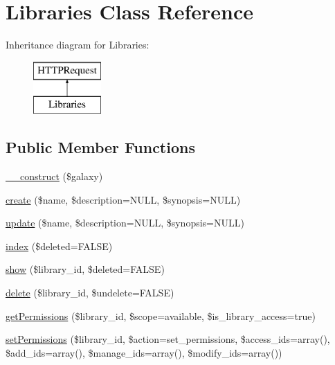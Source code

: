 \hypertarget{classLibraries}{}\section{Libraries Class Reference}
\label{classLibraries}
Inheritance diagram for Libraries\+:\begin{figure}[H]
\begin{center}
\leavevmode
\includegraphics[height=2.000000cm]{classLibraries}
\end{center}
\end{figure}
\subsection*{Public Member Functions}
\begin{DoxyCompactItemize}
\item 
\hyperlink{classLibraries_a84aba8841f094815b3af6e4affed79c0}{\+\_\+\+\_\+construct} (\$galaxy)
\item 
\hyperlink{classLibraries_a5090fa7a9be0e26a91590d651a32abe9}{create} (\$name, \$description=N\+U\+LL, \$synopsis=N\+U\+LL)
\item 
\hyperlink{classLibraries_a66d9b028c4fde6edef8e3b7e0582d884}{update} (\$name, \$description=N\+U\+LL, \$synopsis=N\+U\+LL)
\item 
\hyperlink{classLibraries_a93ffa5a990c77a0872a3adb2f0a69158}{index} (\$deleted=F\+A\+L\+SE)
\item 
\hyperlink{classLibraries_a8310b5f58da502f256e87b8d42915454}{show} (\$library\+\_\+id, \$deleted=F\+A\+L\+SE)
\item 
\hyperlink{classLibraries_a3de3c2fdbaa21d621ad6fd7bb4f83a49}{delete} (\$library\+\_\+id, \$undelete=F\+A\+L\+SE)
\item 
\hyperlink{classLibraries_abad2211e5699eb1c296db1ac22bf478c}{get\+Permissions} (\$library\+\_\+id, \$scope=\textquotesingle{}available\textquotesingle{}, \$is\+\_\+library\+\_\+access=true)
\item 
\hyperlink{classLibraries_aea282014c5f7a983977c2b920885e798}{set\+Permissions} (\$library\+\_\+id, \$action=\textquotesingle{}set\+\_\+permissions\textquotesingle{}, \$access\+\_\+ids=array(), \$add\+\_\+ids=array(), \$manage\+\_\+ids=array(), \$modify\+\_\+ids=array())
\end{DoxyCompactItemize}
